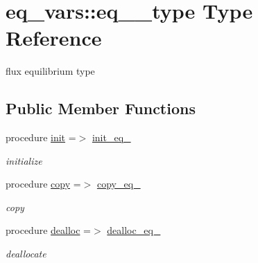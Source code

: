 \hypertarget{structeq__vars_1_1eq__1__type}{}\section{eq\+\_\+vars\+:\+:eq\+\_\+\_\+type Type Reference}
\label{structeq__vars_1_1eq__1__type}


flux equilibrium type  


\subsection*{Public Member Functions}
\begin{DoxyCompactItemize}
\item 
procedure \hyperlink{structeq__vars_1_1eq__1__type_a962ea1977a34077f4c335025ae84fc5e}{init} =$>$ \hyperlink{namespaceeq__vars_a0270785c6b513c53e6d7c837f38f377b}{init\+\_\+eq\+\_}
\begin{DoxyCompactList}\small\item\em initialize \end{DoxyCompactList}\item 
procedure \hyperlink{structeq__vars_1_1eq__1__type_ab454680992dc2c7c620a11d5c25eaba7}{copy} =$>$ \hyperlink{namespaceeq__vars_aa781ffa18b6b17905e126871c43d3267}{copy\+\_\+eq\+\_}
\begin{DoxyCompactList}\small\item\em copy \end{DoxyCompactList}\item 
procedure \hyperlink{structeq__vars_1_1eq__1__type_ae019916ee0792161d559c38bfd50ed50}{dealloc} =$>$ \hyperlink{namespaceeq__vars_ab106dc007ddc896092d0464233b3ce12}{dealloc\+\_\+eq\+\_}
\begin{DoxyCompactList}\small\item\em deallocate \end{DoxyCompactList}\end{DoxyCompactItemize}
